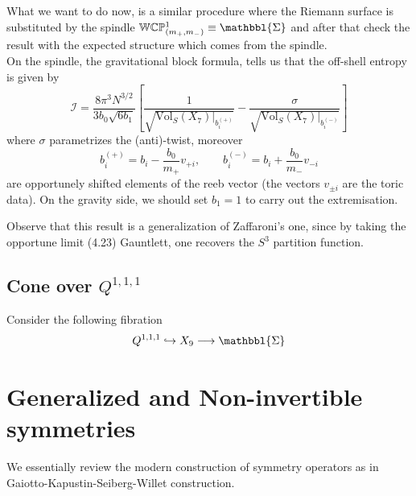 \documentclass[11pt]{article}
\theoremstyle{definition}
\numberwithin{equation}{section}
\newcommand{\Spindle}{\mathbbl{\Sigma}}
\newcommand*\cI{\mathcal{I}}
\newcommand*\bbC{\mathbb{C}}
\newcommand*\bbP{\mathbb{P}}
\newcommand*\bbW{\mathbb{W}}
\begin{document}
What we want to do now, is a similar procedure where the Riemann surface is substituted by the spindle $\bbW\bbC\bbP^{1}_{(m_{+},m_{-})}\equiv\Spindle$ and after that check the result with the expected structure which comes from the spindle.\\
On the spindle, the gravitational block formula, tells us that the off-shell entropy is given by
\begin{equation}
	\cI=\frac{8\pi^{3} N^{3/2}}{3b_{0}\sqrt{6b_{1}}}\left[\frac{1}{\sqrt{\left.\text{Vol}_{S}(X_{7})\right|_{b_{i}^{(+)}}}}-\frac{\sigma}{\sqrt{\left.\text{Vol}_{S}(X_{7})\right|_{b_{i}^{(-)}}}}\right]
\end{equation}
where $\sigma$ parametrizes the (anti)-twist, moreover
\begin{equation}
	b_{i}^{(+)}=b_{i}-\frac{b_{0}}{m_{+}}v_{+i},\qquad b_{i}^{(-)}=b_{i}+\frac{b_{0}}{m_{-}}v_{-i}
\end{equation}
are opportunely shifted elements of the reeb vector (the vectors $v_{\pm i}$ are the toric data). On the gravity side, we should set $b_{1}=1$ to carry out the extremisation.

Observe that this result is a generalization of Zaffaroni's one, since by taking the opportune limit (4.23) Gauntlett, one recovers the $S^{3}$ partition function.

\subsection{Cone over $Q^{1,1,1}$}
Consider the following fibration
\begin{equation}
	Q^{1,1,1}\hookrightarrow X_{9}\longrightarrow\Spindle
\end{equation}

\section{Generalized and Non-invertible symmetries}
We essentially review the modern construction of symmetry operators as in Gaiotto-Kapustin-Seiberg-Willet construction.
\end{document}
